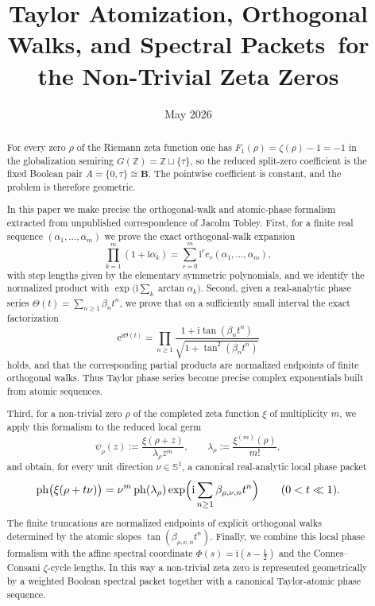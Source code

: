 \documentclass[11pt]{amsart}
\title[Atomic phase packets of zeta zeros]{Taylor Atomization, Orthogonal Walks, and Spectral Packets\ for the Non-Trivial Zeta Zeros}
\author{}
\date{May 2026}
\numberwithin{equation}{section}
\theoremstyle{definition}
\theoremstyle{remark}
\newcommand{\ZZ}{\mathbb Z}
\newcommand{\BB}{\mathbf B}
\newcommand{\Sph}{\mathbb S^1}
\newcommand{\ph}{\operatorname{ph}}
\newcommand{\taup}{\tau}
\newcommand{\e}{\mathrm e}
\newcommand{\ii}{\mathrm i}
\begin{document}
\begin{abstract}
For every zero $\rho$ of the Riemann zeta function one has $F_1(\rho)=\zeta(\rho)-1=-1$ in the globalization semiring $G(\ZZ)=\ZZ\sqcup\{\taup\}$, so the reduced split-zero coefficient is the fixed Boolean pair $A=\{0,\taup\}\cong\BB$.  The pointwise coefficient is constant, and the problem is therefore geometric.

In this paper we make precise the orthogonal-walk and atomic-phase formalism extracted from unpublished correspondence of Jacolm Tobley.  First, for a finite real sequence $(\alpha_1,\dots,\alpha_m)$ we prove the exact orthogonal-walk expansion
\[
\prod_{k=1}^m (1+\ii\alpha_k)=\sum_{r=0}^m \ii^r e_r(\alpha_1,\dots,\alpha_m),
\]
with step lengths given by the elementary symmetric polynomials, and we identify the normalized product with $\exp\bigl(\ii\sum_k \arctan\alpha_k\bigr)$.  Second, given a real-analytic phase series $\Theta(t)=\sum_{n\ge 1}\beta_n t^n$, we prove that on a sufficiently small interval the exact factorization
\[
\e^{\ii\Theta(t)}=\prod_{n\ge 1}\frac{1+\ii\tan(\beta_n t^n)}{\sqrt{1+\tan^2(\beta_n t^n)}}
\]
holds, and that the corresponding partial products are normalized endpoints of finite orthogonal walks.  Thus Taylor phase series become precise complex exponentials built from atomic sequences.

Third, for a non-trivial zero $\rho$ of the completed zeta function $\xi$ of multiplicity $m$, we apply this formalism to the reduced local germ
\[
\psi_\rho(z):=\frac{\xi(\rho+z)}{\lambda_\rho z^m},\qquad \lambda_\rho:=\frac{\xi^{(m)}(\rho)}{m!},
\]
and obtain, for every unit direction $\nu\in\Sph$, a canonical real-analytic local phase packet
\[
\ph\bigl(\xi(\rho+t\nu)\bigr)=\nu^m\ph(\lambda_\rho)\exp\Bigl(\ii\sum_{n\ge 1}\beta_{\rho,\nu,n}t^n\Bigr)
\qquad (0<t\ll 1).
\]
The finite truncations are normalized endpoints of explicit orthogonal walks determined by the atomic slopes $\tan(\beta_{\rho,\nu,n}t^n)$.  Finally, we combine this local phase formalism with the affine spectral coordinate $\Phi(s)=\ii(s-\tfrac12)$ and the Connes--Consani $\zeta$-cycle lengths.  In this way a non-trivial zeta zero is represented geometrically by a weighted Boolean spectral packet together with a canonical Taylor-atomic phase sequence.
\end{abstract}

\maketitle
\end{document}
